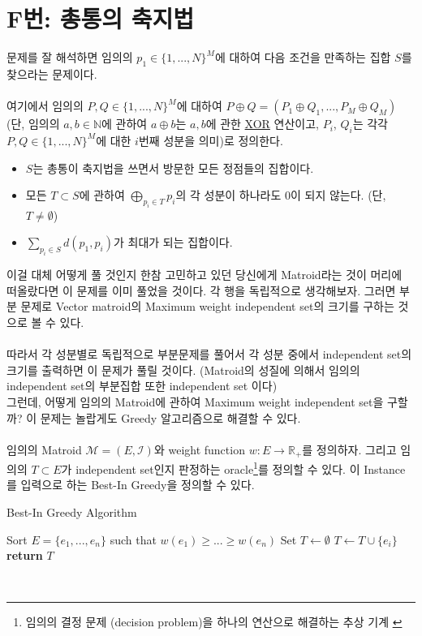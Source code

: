 \documentclass{article}
\begin{document}
\section{F번: 총통의 축지법}
    문제를 잘 해석하면 임의의 $p_{1} \in \{1,...,N\}^{M}$에 대하여 다음 조건을 만족하는 집합 $S$를 찾으라는 문제이다. \\ \\
	여기에서 임의의 $P, Q \in \{1,...,N\}^{M}$에 대하여 $P \oplus Q = (P_{1} \oplus Q_{1},...,P_{M} \oplus Q_{M})$ 
	(단, 임의의 $a, b \in \mathbb{N}$에 관하여 $a \oplus b$는 $a, b$에 관한 \href{https://en.wikipedia.org/wiki/Exclusive_or}{XOR} 연산이고, $P_{i}$, $Q_{i}$는 각각 $P, Q \in \{1,...,N\}^{M}$에 대한 $i$번째 성분을 의미)로 정의한다.
    \begin{itemize}
        \item $S$는 총통이 축지법을 쓰면서 방문한 모든 정점들의 집합이다.
        \item 모든 $T \subset S$에 관하여 $\bigoplus_{p_{i} \in T} p_{i}$의 각 성분이 하나라도 0이 되지 않는다. (단, $T \neq \emptyset$)
        \item $\sum_{p_{i} \in S} d(p_{1}, p_{i})$가 최대가 되는 집합이다.
	\end{itemize}
	이걸 대체 어떻게 풀 것인지 한참 고민하고 있던 당신에게 Matroid라는 것이 머리에 떠올랐다면 이 문제를 이미 풀었을 것이다.
	각 행을 독립적으로 생각해보자. 
	그러면 부분 문제로 Vector matroid의 Maximum weight independent set의 크기를 구하는 것으로 볼 수 있다. \\ \\
	따라서 각 성분별로 독립적으로 부분문제를 풀어서 각 성분 중에서 independent set의 크기를 출력하면 이 문제가 풀릴 것이다. (Matroid의 성질에 의해서 임의의 independent set의 부분집합 또한 independent set 이다) \\
	그런데, 어떻게 임의의 Matroid에 관하여 Maximum weight independent set을 구할까?
	이 문제는 놀랍게도 Greedy 알고리즘으로 해결할 수 있다. \\ \\ 
	임의의 Matroid $\mathcal{M}=(E,\mathcal{I})$와 weight function $w: E \to \mathbb{R}_{+}$를 정의하자.
	그리고 임의의 $T \subset E$가 independent set인지 판정하는 oracle\footnote{임의의 결정 문제 (decision problem)을 하나의 연산으로 해결하는 추상 기계 \cite{oracle}}를 정의할 수 있다.
	이 Instance를 입력으로 하는 Best-In Greedy을 정의할 수 있다. \cite[p.~317--318]{korte_vygen_2008}
	\begin{algorithm}
		\caption{Best-In Greedy Algorithm}
		\label{best_in_greedy}
		\begin{algorithmic}[1]
				\State Sort $E=\{e_{1},...,e_{n}\}$ such that $w(e_{1}) \geq ... \geq w(e_{n})$
				\State Set $T \gets \emptyset$
						\State $T \gets T \cup \{e_{i}\}$
					\EndIf
				\EndFor
				\State \textbf{return} $T$
			\EndProcedure
		\end{algorithmic}
	\end{algorithm} \\
\end{document}
